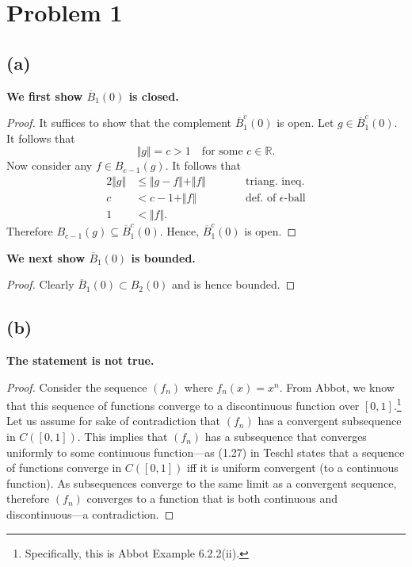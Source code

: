 \documentclass[10pt]{article}
\begin{document}
\section*{Problem 1}

\subsection*{(a)}

\textbf{We first show $\overline{B}_1(0)$ is closed.}

\begin{proof}
    It suffices to show that the complement $\overline{B}^c_1(0)$ is open. Let $g \in \overline{B}^c_1(0).$ It follows that
    \[\Vert g\Vert = c > 1 \quad\text{for some }c\in\mathbb{R}.\]
    Now consider any $f\in B_{c-1}(g).$ It follows that
    \begin{alignat*}{2}
        \Vert g\Vert &\le \Vert g - f\Vert + \Vert f\Vert \qquad&&\text{triang. ineq.}\\
        c &< c-1 + \Vert f\Vert  &&\text{def. of $\epsilon$-ball}\\
        1 &< \Vert f \Vert.
    \end{alignat*}
    Therefore $B_{c-1}(g) \subseteq \overline{B}_1^c(0).$ Hence, $\overline{B}_1^c(0)$ is open.
\end{proof}

\noindent
\textbf{We next show $\overline{B}_1(0)$ is bounded.}

\begin{proof}
    Clearly $\overline{B}_1(0)\subset B_2(0)$ and is hence bounded.
\end{proof}

\subsection*{(b)}

\textbf{The statement is not true.}

\begin{proof}
    Consider the sequence $(f_n)$ where $f_n(x) = x^n.$ From Abbot, we know that this sequence of functions converge to a discontinuous function over $[0,1]$.\footnote{Specifically, this is Abbot Example 6.2.2(ii).} 
    Let us assume for sake of contradiction that $(f_n)$ has a convergent subsequence in $C([0,1])$. This implies that $(f_n)$ has a subsequence that converges uniformly to some continuous function---as (1.27) in Teschl states that a sequence of functions converge in $C([0,1])$ iff it is uniform convergent (to a continuous function). As subsequences converge to the same limit as a convergent sequence, therefore $(f_n)$ converges to a function that is both continuous and discontinuous---a contradiction.
\end{proof}
\end{document}
